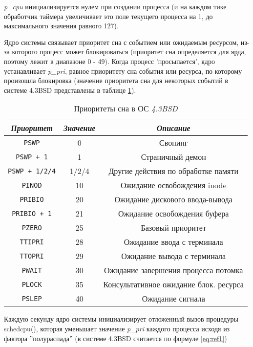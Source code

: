 \textit{p\_cpu} инициализируется нулем при создании процесса (и на каждом тике обработчик таймера увеличивает это поле текущего процесса на 1, до максимального значения равного 127).

Ядро системы связывает приоритет сна с событием или ожидаемым ресурсом, из-за которого процесс может блокироваться (приоритет сна определяется для ярда, поэтому лежит в диапазоне 0 - 49). Когда процесс 'просыпается', ядро устанавливает \textit{p\_pri}, равное приоритету сна события или ресурса, по которому произошла блокировка (значение приоритета сна для некоторых событий в системе 4.3BSD представлены в таблице \ref{tab:bsd}).


\begin{table}[h!]
	\caption{Приоритеты
		сна в ОС \textit{4.3BSD}}
	\label{tab:bsd}
	\begin{center}
		\begin{tabular}{ |c|c|c|  }
			\hline
			\textit{Приоритет} & \textit{Значение} & \textit{Описание} \\
			\hline
			\texttt{PSWP} & 0 & Свопинг \\
			\hline
			\texttt{PSWP + 1} & 1 & Страничный демон \\
			\hline
			\texttt{PSWP + 1/2/4} & 1/2/4 & Другие действия по обработке памяти \\
			\hline
			\texttt{PINOD} & 10 & Ожидание освобождения inode \\
			\hline
			\texttt{PRIBIO} & 20 & Ожидание дискового ввода-вывода \\
			\hline
			\texttt{PRIBIO + 1} & 21 & Ожидание освобождения буфера \\
			\hline
			\texttt{PZERO} & 25 & Базовый приоритет \\
			\hline
			\texttt{TTIPRI} & 28 & Ожидание ввода с терминала \\
			\hline
			\texttt{TTOPRI} & 29 & Ожидание вывода с терминала \\
			\hline 
			\texttt{PWAIT} & 30 & Ожидание завершения процесса потомка \\
			\hline
			\texttt{PLOCK} & 35 & Консультативное ожидание блок. ресурса \\
			\hline
			\texttt{PSLEP} & 40 & Ожидание сигнала \\
			\hline
		\end{tabular}
	\end{center}
\end{table}

Каждую секунду ядро системы инициализирует отложенный вызов процедуры schedcpu(), которая уменьшает значение \textit{p\_pri} каждого процесса исходя из фактора ''полураспада'' (в системе 4.3BSD считается по формуле \ref{eq:ref1})

